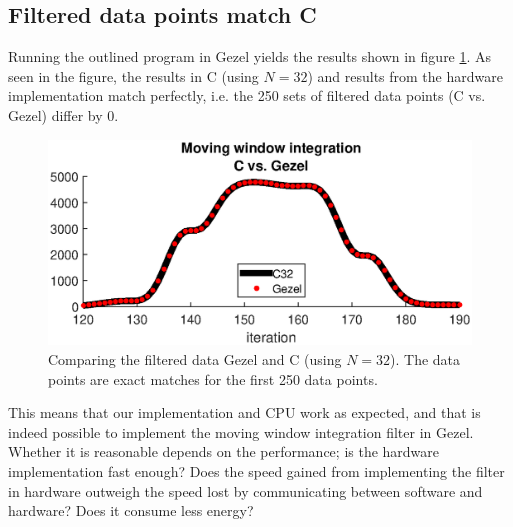 \subsection{Filtered data points match C}
\label{sec:filteredDataPointsMatchC}

Running the outlined program in Gezel yields the results shown in figure \ref{fig:CvsGezel}. As seen in the figure, the results in C (using $N=32$) and results from the hardware implementation match perfectly, i.e. the 250 sets of filtered data points (C vs. Gezel) differ by 0.

\begin{figure}[H]
\centering
\includegraphics[width=1.0\textwidth]{3Results/fig/CvsGezel.eps}
\caption{Comparing the filtered data Gezel and C (using $N=32$). The data points are exact matches for the first 250 data points.}
\label{fig:CvsGezel}
\end{figure}

This means that our implementation and CPU work as expected, and that is indeed possible to implement the moving window integration filter in Gezel. Whether it is reasonable depends on the performance; is the hardware implementation fast enough? Does the speed gained from implementing the filter in hardware outweigh the speed lost by communicating between software and hardware? Does it consume less energy?
